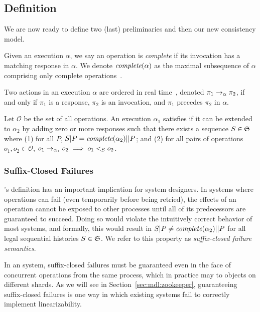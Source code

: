 \subsection{Definition}
\label{sec:mdl:def}

We are now ready to define two (last) preliminaries and then our new consistency model.

 Given an execution $\alpha$, we say an
operation is \textit{complete} if its invocation has a matching response in
$\alpha$. We denote $\operatorname*{\textit{complete}}(\alpha)$ as the maximal subsequence of $\alpha$
comprising only complete operations~\cite{herlihy1990linearizability}.

 Two actions in an execution $\alpha$ are
ordered in real
time~\cite{herlihy1990linearizability}, denoted
$\pi_1 \rightarrow_\alpha \pi_2$, if and only if $\pi_1$ is a response, $\pi_2$ is an
invocation, and $\pi_1$ precedes $\pi_2$ in $\alpha$.

 Let $\mathcal{O}$ be the
set of all operations. An execution $\alpha_1$ satisfies \textit{\MDL{}} if it
can be extended to $\alpha_2$ by adding zero or more responses such that there
exists a sequence $S \in \mathfrak{S}$ where (1) for all $P$,
$S|P = \operatorname*{\textit{complete}}(\alpha_2)||P$; and (2) for all pairs of operations
$o_1,o_2 \in \mathcal{O}$, $o_1 \rightarrow_{\alpha_1} o_2 \implies o_1 <_S o_2$.

\subsubsection{Suffix-Closed Failures}
\label{sec:mdl:def:failures}

\MDL{}'s definition has an important implication for system designers.
In systems where operations can fail (even temporarily before being retried), the effects
of an operation cannot be exposed to other processes until all of its predecessors are
guaranteed to succeed. Doing so would violate the intuitively correct behavior of most
systems, and formally, this would result in $S|P \neq \operatorname*{\textit{complete}}(\alpha_2)||P$ for all legal
sequential histories $S \in \mathfrak{S}$. We refer to this property as
\textit{suffix-closed failure semantics}.

In an \MDL{} system, suffix-closed failures must be guaranteed even in the
face of concurrent operations from the same process, which in practice may to
objects on different shards. As we will see in Section~\ref{sec:mdl:zookeeper},
guaranteeing suffix-closed failures is one way in which existing systems fail
to correctly implement \multidispatch{} linearizability.  

